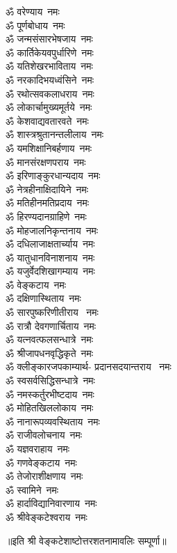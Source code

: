 \begin{multicols}{2}
\begin{flushleft}
        ॐ वरेण्याय~नमः\\
        ॐ पूर्णबोधाय~नमः\\
        ॐ जन्मसंसारभेषजाय~नमः\\
        ॐ कार्तिकेयवपुर्धारिणे~नमः\\
        ॐ यतिशेखरभाविताय~नमः\\
        ॐ नरकादिभयध्वंसिने~नमः\\
        ॐ रथोत्सवकलाधराय~नमः\\
        ॐ लोकार्चामुख्यमूर्तये~नमः\\
        ॐ केशवाद्यवतारवते~नमः\hfill{}\\
                                                        
        ॐ शास्त्रश्रुतानन्तलीलाय~नमः\\
        ॐ यमशिक्षानिबर्हणाय~नमः\\
        ॐ मानसंरक्षणपराय~नमः\\
        ॐ इरिणाङ्कुरधान्यदाय~नमः\\
        ॐ नेत्रहीनाक्षिदायिने~नमः\\
        ॐ मतिहीनमतिप्रदाय~नमः\\
        ॐ हिरण्यदानग्राहिणे~नमः\\
        ॐ मोहजालनिकृन्तनाय~नमः\\
        ॐ दधिलाजाक्षतार्च्याय~नमः\\
        ॐ यातुधानविनाशनाय~नमः\hfill{}\\
                                                        
        ॐ यजुर्वेदशिखागम्याय~नमः\\
        ॐ वेङ्कटाय~नमः\\
        ॐ दक्षिणास्थिताय~नमः\\
        ॐ सारपुष्करिणीतीराय ~नमः\\
        ॐ रात्रौ  देवगणार्चिताय~नमः\\
        ॐ यत्नवत्फलसन्धात्रे~नमः\\
        ॐ श्रीजापधनवृद्धिकृते~नमः\\
        ॐ क्लीङ्कारजपकाम्यार्थ-
        प्रदानसदयान्तराय ~नमः\\
        ॐ स्वसर्वसिद्धिसन्धात्रे~नमः\\
        ॐ नमस्कर्तुरभीष्टदाय~नमः\hfill{}\\
        
        ॐ मोहितखिललोकाय~नमः\\
        ॐ नानारूपव्यवस्थिताय~नमः\\
        ॐ राजीवलोचनाय~नमः\\
        ॐ यज्ञवराहाय~नमः\\
        ॐ गणवेङ्कटाय~नमः\\
        ॐ तेजोराशीक्षणाय~नमः\\
        ॐ स्वामिने~नमः\\
        ॐ हार्दाविद्यानिवारणाय~नमः\hfill{}\\
        ॐ श्रीवेङ्कटेश्वराय~नमः\\
    \end{flushleft}
\end{multicols}
\centerline{॥इति श्री वेङ्कटेशाष्टोत्तरशतनामावलिः सम्पूर्णा॥}
